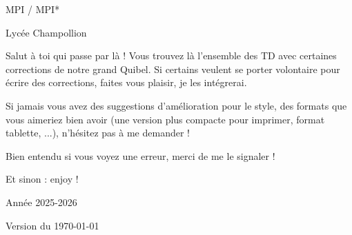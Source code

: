 \documentclass{../../commun/prepacours}
\begin{document}
\begin{center}
  \vspace*{2cm}
  
  
  \vspace{1.5cm}
  {\Large MPI / MPI* \par}
  \vspace{0.5cm}
  {\large Lycée Champollion \par}
  \vspace{2cm}
  
  \begin{minipage}{0.8\textwidth}
    \vspace{0.5cm}
    
    Salut à toi qui passe par là ! Vous trouvez là l'ensemble des TD avec certaines corrections de notre grand Quibel. 
    Si certains veulent se porter volontaire pour écrire des corrections, faites 
    vous plaisir, je les intégrerai. 

    \avspace Si jamais vous avez des suggestions d'amélioration pour le style, 
    des formats que vous aimeriez bien avoir (une version plus compacte pour 
    imprimer, format tablette, ...), n'hésitez pas à me demander !

    \avspace Bien entendu si vous voyez une erreur, merci de me le signaler !

    \begin{center}
      Et sinon : enjoy !
    \end{center}
    
    \vspace{0.5cm}
  \end{minipage}
  
  \vfill
  {\Large Année 2025-2026 \par}
  \vspace{0.5cm}
  {\normalsize Version du \today \par}
  \vspace{1cm}
\end{center}
\clearpage
\end{document}
